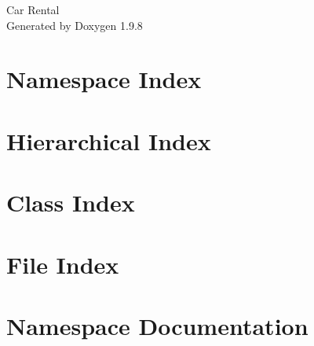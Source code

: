 \documentclass[twoside]{book}
\newcommand{\+}{\discretionary{\mbox{\scriptsize$\hookleftarrow$}}{}{}}
\newcommand{\clearemptydoublepage}{%
    \newpage{\pagestyle{empty}\cleardoublepage}%
  }
\begin{document}
  \raggedbottom
    \hypersetup{pageanchor=false,
                bookmarksnumbered=true,
                pdfencoding=unicode
               }
  \begin{titlepage}
  \vspace*{7cm}
  \begin{center}%
  {\Large Car Rental}\\
  \vspace*{1cm}
  {\large Generated by Doxygen 1.9.8}\\
  \end{center}
  \end{titlepage}
  \clearemptydoublepage
  \tableofcontents
  \clearemptydoublepage
  \hypersetup{pageanchor=true}

\chapter{Namespace Index}

\chapter{Hierarchical Index}

\chapter{Class Index}

\chapter{File Index}

\chapter{Namespace Documentation}











\end{document}
